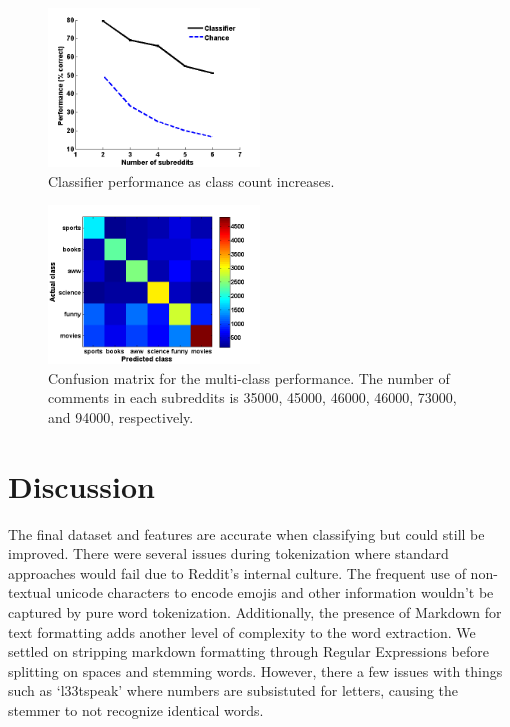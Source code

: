 \documentclass[10pt,twocolumn]{article}
\begin{document}
\begin{figure}
    \centering
  	\includegraphics[width=0.5\textwidth]{./varyWBaseline.png}
  	\caption{Classifier performance as class count increases.}
  	\label{classes}
\end{figure}	

\begin{figure}
    \centering
  	\includegraphics[width=0.5\textwidth]{./confusion_mat.png}
  	\caption{Confusion matrix for the multi-class performance. The number of comments in each subreddits is 35000, 45000, 46000, 46000, 73000, and 94000, respectively.}
  	\label{confusion}
\end{figure}	

\section{Discussion}
The final dataset and features are accurate when classifying but could still be improved. There were several issues during tokenization where standard approaches would fail due to Reddit's internal culture. The frequent use of non-textual unicode characters to encode emojis and other information wouldn't be captured by pure word tokenization. Additionally, the presence of Markdown\cite{gruber} for text formatting adds another level of complexity to the word extraction. We settled on stripping markdown formatting through Regular Expressions before splitting on spaces and stemming\cite{porter1980algorithm} words. However, there a few issues with things such as `l33tspeak' where numbers are subsistuted for letters, causing the stemmer to not recognize identical words. 
\end{document}
